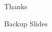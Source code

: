 \begin{frame}[c]
	\begin{center}
	\Huge Thanks
	\end{center}
\end{frame}

\begin{frame}[c]
	\begin{center}
	\Huge Backup Slides
	\end{center}
\end{frame}



